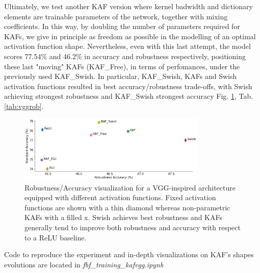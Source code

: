 \documentclass[LaM,binding=0.6cm]{./packages/sapthesis/sapthesis}
\begin{document}
        Ultimately, we test another KAF version where kernel badwidth and dictionary elements are trainable parameters of the network, together with mixing coefficients. In this 
        way, by doubling the number of parameters required for KAFs, we give in principle as freedom as possible in the modelling of an optimal activation function shape. Nevertheless,
        even with this last attempt, the model scores 77.54\% and 46.2\% in accuracy and robustness respectively, positioning these last "moving" KAFs (KAF\_Free), 
        in terms of perfomances, under the previously used KAF\_Swish. In particular, KAF\_Swish, KAFs and Swish activation functions resulted in best accuracy/robustness trade-offs,
        with Swish achieving strongest robustness and KAF\_Swish strongest accuracy Fig. \ref{fig:accrob1}, Tab. \ref{tab:vggrob}.    
        \begin{figure}[h!]
            \centering
            \includegraphics[width=0.8\textwidth]{rob_af.png}
            \caption{Robustness/Accuracy visualization for a VGG-inspired architecture equipped with different activation functions. 
            Fixed activation functions are shown with a thin diamond whereas non-parametric KAFs with a filled x. Swish achieves best robustness and KAFs generally tend 
            to improve both robustness and accuracy with respect to a ReLU baseline.}
            \label{fig:accrob1}
        \end{figure}
        Code to reproduce the experiment and in-depth visualizations on KAF's shapes evolutions are located in \textit{fbf\_training\_kafvgg.ipynb}
\end{document}
